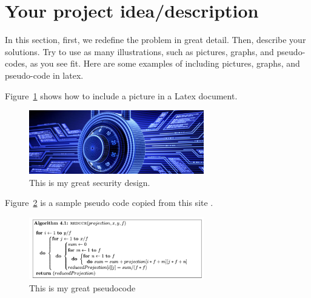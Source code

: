 \section{Your project idea/description}

In this section, first, we redefine the problem in great detail. Then, describe your solutions. Try to use as many illustrations, such as pictures, graphs, and pseudo-codes, as you see fit. Here are some examples of including pictures, graphs, and pseudo-code in latex. 

%
%
Figure~\ref{fig:fig1} shows how to include a picture in a Latex document. 
\begin{figure}[!ht]
 \centering
\includegraphics[width=3in]{figures/sample_1.jpg}
\caption{\label{fig:fig1}This is my great security design.}
\end{figure}

%
%
Figure~\ref{fig:fig2} is a sample pseudo code copied from this site \cite{pseudocode}. 

\begin{figure}[!ht]
 \centering
\includegraphics[width=3in]{figures/algorithm.png}

  \caption{\label{fig:fig2}This is my great pseudocode}
  
  \end{figure}





%
%

